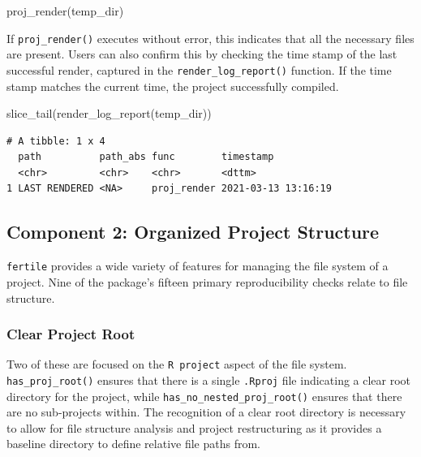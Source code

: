 \documentclass[12pt,twoside]{reedthesis}
\newenvironment{Shaded}{\begin{snugshade}}{\end{snugshade}}
\newcommand{\FunctionTok}[1]{\textcolor[rgb]{0.00,0.00,0.00}{#1}}
\newcommand{\NormalTok}[1]{#1}
\begin{document}
\begin{Shaded}
\begin{Highlighting}[]
\FunctionTok{proj\_render}\NormalTok{(temp\_dir)}
\end{Highlighting}
\end{Shaded}
If \texttt{proj\_render()} executes without error, this indicates that all the necessary files are present. Users can also confirm this by checking the time stamp of the last successful render, captured in the \texttt{render\_log\_report()} function. If the time stamp matches the current time, the project successfully compiled.
\begin{Shaded}
\begin{Highlighting}[]
\FunctionTok{slice\_tail}\NormalTok{(}\FunctionTok{render\_log\_report}\NormalTok{(temp\_dir))}
\end{Highlighting}
\end{Shaded}
\begin{verbatim}
# A tibble: 1 x 4
  path          path_abs func        timestamp          
  <chr>         <chr>    <chr>       <dttm>             
1 LAST RENDERED <NA>     proj_render 2021-03-13 13:16:19
\end{verbatim}
\hypertarget{component-2-organized-project-structure}{%
\subsection{Component 2: Organized Project Structure}\label{component-2-organized-project-structure}}

\texttt{fertile} provides a wide variety of features for managing the file system of a project. Nine of the package's fifteen primary reproducibility checks relate to file structure.

\hypertarget{clear-project-root}{%
\subsubsection{Clear Project Root}\label{clear-project-root}}

Two of these are focused on the \texttt{R\ project} aspect of the file system. \texttt{has\_proj\_root()} ensures that there is a single \texttt{.Rproj} file indicating a clear root directory for the project, while \texttt{has\_no\_nested\_proj\_root()} ensures that there are no sub-projects within. The recognition of a clear root directory is necessary to allow for file structure analysis and project restructuring as it provides a baseline directory to define relative file paths from.
\end{document}
